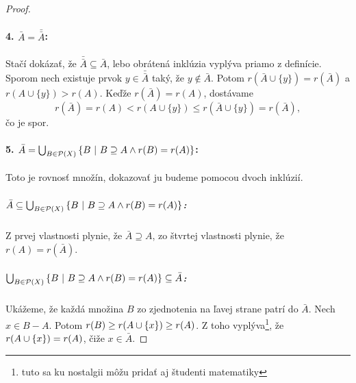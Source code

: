 \begin{proof}
\paragraph{4. $\bar{A} = \bar{\bar{A}}$:} Stačí dokázať, že $\bar{\bar{A}}\subseteq\bar{A}$, lebo obrátená inklúzia
vyplýva priamo z definície. Sporom nech existuje prvok $y\in\bar{\bar{A}}$
taký, že $y\notin \bar{A}$. Potom $r(\bar{A}\cup\{y\})=r(\bar{A})$ a
$r(A\cup\{y\})>r(A)$. Keďže $r(\bar A)=r(A)$, dostávame
$$r(\bar{A})=r(A)<r(A\cup \{y\})\le r(\bar{A}\cup\{y\})=r(\bar{A}),$$
čo je spor.

\paragraph{5. $\bar{A} = \bigcup_{B \in \mathcal{P}(X)} \left\{B ~|~ B \supseteq A \wedge r(B) = r(A)\right\}$:}
Toto je rovnosť množín, dokazovať ju budeme pomocou dvoch inklúzií.
\subparagraph{$\bar{A} \subseteq \bigcup_{B \in \mathcal{P}(X)} \left\{B ~|~ B \supseteq A \wedge r(B) = r(A)\right\}$:} Z prvej vlastnosti plynie, že $\bar{A} \supseteq A$, zo štvrtej vlastnosti plynie, že $r(A) = r(\bar{A})$.
\subparagraph{$\bigcup_{B \in \mathcal{P}(X)} \left\{B ~|~ B \supseteq A \wedge r(B) = r(A)\right\} \subseteq \bar{A}$:}
Ukážeme, že každá množina $B$ zo zjednotenia na ľavej strane patrí do $\bar{A}$.
Nech $x \in B - A$.
Potom $r(B) \geq r(A \cup \left\{x\right\}) \geq r(A)$.
Z toho vyplýva\footnote{tuto sa ku nostalgii môžu pridať aj študenti matematiky}, že $r(A \cup \left\{x\right\}) = r(A)$, čiže $x \in \bar{A}$.
\end{proof}

